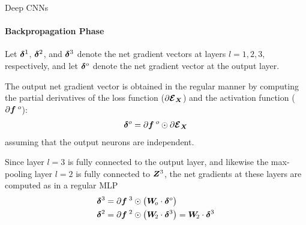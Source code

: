 \begin{frame}{Deep CNNs}
\framesubtitle{Backpropagation Phase}
Let ${\bm \delta}^1$, ${\bm \delta}^2$, 
and ${\bm \delta}^3$ 
denote the net gradient vectors at 
layers $l=1, 2, 3$, respectively, and let
${\bm \delta}^o$ denote the net gradient vector 
at the output layer. 


\medskip


The
output net gradient vector is obtained in the regular manner by computing the
partial derivatives of the loss function ($\partial {\bm{\mathcal E}}_{\boldsymbol X}$) and the
activation function ($\partial {\boldsymbol f}^{\;o}$):
\begin{align*}
    {\bm \delta}^o = \partial{\boldsymbol f}^{\;o} \odot \partial{\bm{\mathcal E}}_{{\boldsymbol X}}
\end{align*}
assuming that the output neurons are independent.


\medskip


Since layer $l=3$ is fully connected to the output layer, and likewise
the max-pooling layer $l=2$ is fully connected to ${\boldsymbol Z}^3$, the net
gradients at these layers are computed as in a regular MLP
\begin{align*}
    {\bm \delta}^3 & = \partial{\boldsymbol f}^{\;3} \odot \bigl( {\boldsymbol W}_{\!o} \cdot
    {\bm \delta}^o \bigr)\\
    {\bm \delta}^2 & = \partial{\boldsymbol f}^{\;2} \odot \bigl( {\boldsymbol W}_{\!2} \cdot
    {\bm \delta}^3 \bigr) = {\boldsymbol W}_{\!2} \cdot
    {\bm \delta}^3 
\end{align*}
\end{frame}


